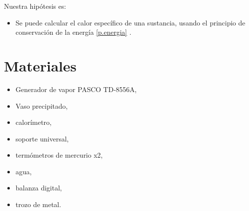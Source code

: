 \documentclass[a4paper, 12p]{article}
\begin{document}
Nuestra hipótesis es:
\begin{itemize}
      \item Se puede calcular el calor específico de una sustancia, usando el principio de conservación de la energía \eqref{p.energia} .
\end{itemize}


\section{Materiales}


\begin{itemize}
      \item Generador de vapor PASCO TD-8556A,
      \item Vaso precipitado,
      \item calorímetro,
       \item soporte universal,
      \item termómetros de mercurio x2,
      \item agua,
      \item balanza digital,
      \item trozo de metal.
\end{itemize}
\end{document}
